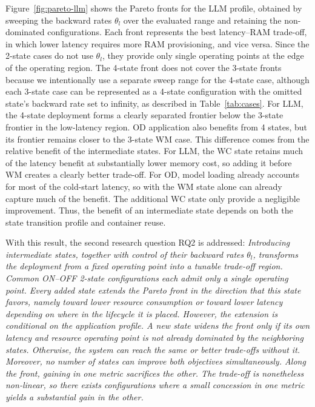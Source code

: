 Figure~\ref{fig:pareto-llm} shows the Pareto fronts for the LLM profile, obtained by sweeping the backward rates $\theta_l$ over the evaluated range and retaining the non-dominated configurations. Each front represents the best latency–RAM trade-off, in which lower latency requires more RAM provisioning, and vice versa. Since the 2-state cases do not use $\theta_l$, they provide only single operating points at the edge of the operating region. The 4-state front does not cover the 3-state fronts because we intentionally use a separate sweep range for the 4-state case, although each 3-state case can be represented as a 4-state configuration with the omitted state's backward rate set to infinity, as described in Table~\ref{tab:cases}. For LLM, the 4-state deployment forms a clearly separated frontier below the 3-state frontier in the low-latency region. OD application also benefits from 4 states, but its frontier remains closer to the 3-state WM case. This difference comes from the relative benefit of the intermediate states. For LLM, the WC state retains much of the latency benefit at substantially lower memory cost, so adding it before WM creates a clearly better trade-off. For OD, model loading already accounts for most of the cold-start latency, so with the WM state alone can already capture much of the benefit. The additional WC state only provide a negligible improvement. Thus, the benefit of an intermediate state depends on both the state transition profile and container reuse. 



With this result, the second research question RQ2 is addressed:  \textit{Introducing intermediate states, together with control of their backward rates $\theta_l$, transforms the deployment from a fixed operating point into a tunable trade-off region. Common ON--OFF 2-state configurations each admit only a single operating point. Every added state extends the Pareto front in the direction that this state favors, namely toward lower resource consumption or toward lower latency depending on where in the lifecycle it is placed. However, the extension is conditional on the application profile. A new
state widens the front only if its own latency and resource operating
point is not already dominated by the neighboring states. Otherwise,
the system can reach the same or better trade-offs without it. Moreover,
no number of states can improve both objectives simultaneously. Along the
front, gaining in one metric sacrifices the other. The trade-off is
nonetheless non-linear, so there exists configurations where a small concession
in one metric yields a substantial gain in the other.}


 
